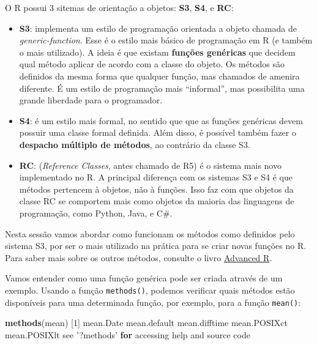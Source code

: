 \documentclass[10pt,a4paper]{book}
\newenvironment{Shaded}{\begin{snugshade}}{\end{snugshade}}
\newcommand{\KeywordTok}[1]{\textcolor[rgb]{0.13,0.29,0.53}{\textbf{#1}}}
\newcommand{\DecValTok}[1]{\textcolor[rgb]{0.00,0.00,0.81}{#1}}
\newcommand{\StringTok}[1]{\textcolor[rgb]{0.31,0.60,0.02}{#1}}
\newcommand{\ControlFlowTok}[1]{\textcolor[rgb]{0.13,0.29,0.53}{\textbf{#1}}}
\newcommand{\NormalTok}[1]{#1}
\providecommand{\tightlist}{%
  \setlength{\itemsep}{0pt}\setlength{\parskip}{0pt}}
\begin{document}
O R possui 3 sitemas de orientação a objetos: \textbf{S3}, \textbf{S4},
e \textbf{RC}:

\begin{itemize}
\tightlist
\item
  \textbf{S3}: implementa um estilo de programação orientada a objeto
  chamada de \emph{generic-function}. Esse é o estilo mais básico de
  programação em R (e também o mais utilizado). A ideia é que existam
  \textbf{funções genéricas} que decidem qual método aplicar de acordo
  com a classe do objeto. Os métodos são definidos da mesma forma que
  qualquer função, mas chamados de amenira diferente. É um estilo de
  programação mais ``informal'', mas possibilita uma grande liberdade
  para o programador.
\item
  \textbf{S4}: é um estilo mais formal, no sentido que que as funções
  genéricas devem possuir uma classe formal definida. Além disso, é
  possível também fazer o \textbf{despacho múltiplo de métodos}, ao
  contrário da classe S3.
\item
  \textbf{RC}: (\emph{Reference Classes}, antes chamado de R5) é o
  sistema mais novo implementado no R. A principal diferença com os
  sistemas S3 e S4 é que métodos pertencem à objetos, não à funções.
  Isso faz com que objetos da classe RC se comportem mais como objetos
  da maioria das linguagens de programação, como Python, Java, e C\#.
\end{itemize}

Nesta sessão vamos abordar como funcionam os métodos como definidos pelo
sistema S3, por ser o mais utilizado na prática para se criar novas
funções no R. Para saber mais sobre os outros métodos, consulte o livro
\href{http://adv-r.had.co.nz/OO-essentials.html}{Advanced R}.

Vamos entender como uma função genérica pode ser criada através de um
exemplo. Usando a função \texttt{methods()}, podemos verificar quais
métodos estão disponíveis para uma determinada função, por exemplo, para
a função \texttt{mean()}:

\begin{Shaded}
\begin{Highlighting}[]
\KeywordTok{methods}\NormalTok{(mean)}
\NormalTok{[}\DecValTok{1}\NormalTok{] mean.Date     mean.default  mean.difftime mean.POSIXct  mean.POSIXlt }
\NormalTok{see }\StringTok{'?methods'} \ControlFlowTok{for}\NormalTok{ accessing help and source code}
\end{Highlighting}
\end{Shaded}
\end{document}
